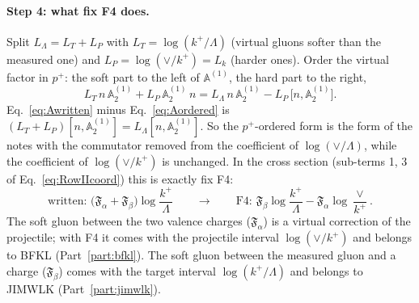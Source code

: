 \documentclass[10pt]{article}
\numberwithin{equation}{section}
\begin{document}
\paragraph{Step 4: what fix F4 does.} Split $L_\Lambda=L_T+L_P$ with $L_T=\log(k^+/\Lambda)$ (virtual gluons softer than the measured one) and $L_P=\log(\vee/k^+)=L_k$ (harder ones). Order the virtual factor in $p^+$: the soft part to the left of $\mathbb A^{(1)}$, the hard part to the right,
\begin{equation}
L_T\,n\,\mathbb A^{(1)}_2+L_P\,\mathbb A^{(1)}_2\,n=L_\Lambda\,n\,\mathbb A^{(1)}_2-L_P\,\big[n,\mathbb A^{(1)}_2\big].
\label{eq:Aordered}
\end{equation}
Eq.~\eqref{eq:Awritten} minus Eq.~\eqref{eq:Aordered} is $(L_T+L_P)[n,\mathbb A^{(1)}_2]=L_\Lambda[n,\mathbb A^{(1)}_2]$. So the $p^+$-ordered form is the form of the notes with the commutator removed from the coefficient of $\log(\vee/\Lambda)$, while the coefficient of $\log(\vee/k^+)$ is unchanged. In the cross section (sub-terms 1, 3 of Eq.~\eqref{eq:RowIIcoord}) this is exactly fix F4:
\begin{equation}
\text{written: }\big(\mathfrak F_\alpha+\mathfrak F_\beta\big)\log\frac{k^+}{\Lambda}\qquad\longrightarrow\qquad\text{F4: }\mathfrak F_\beta\log\frac{k^+}{\Lambda}-\mathfrak F_\alpha\log\frac{\vee}{k^+}.
\label{eq:F4meaning}
\end{equation}
The soft gluon between the two valence charges ($\mathfrak F_\alpha$) is a virtual correction of the projectile; with F4 it comes with the projectile interval $\log(\vee/k^+)$ and belongs to BFKL (Part~\ref{part:bfkl}). The soft gluon between the measured gluon and a charge ($\mathfrak F_\beta$) comes with the target interval $\log(k^+/\Lambda)$ and belongs to JIMWLK (Part~\ref{part:jimwlk}).
\end{document}
